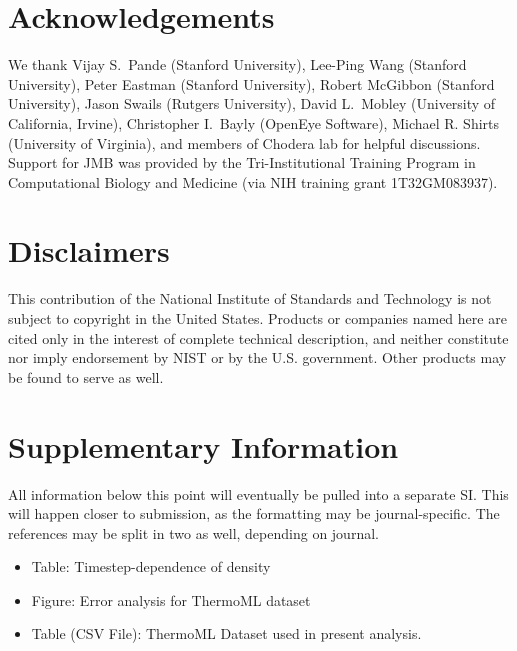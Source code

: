 \documentclass[aps,pre,twocolumn,nofootinbib,superscriptaddress,linenumbers]{revtex4-1}
\begin{document}
\section{Acknowledgements}

We thank Vijay S.~Pande (Stanford University), Lee-Ping Wang (Stanford University), Peter Eastman (Stanford University), Robert McGibbon (Stanford University), Jason Swails (Rutgers University), David L.~Mobley (University of California, Irvine), Christopher I.~Bayly (OpenEye Software), Michael R. Shirts (University of Virginia), and members of Chodera lab for helpful discussions.  
Support for JMB was provided by the Tri-Institutional Training Program in Computational Biology and Medicine (via NIH training grant 1T32GM083937).


\section{Disclaimers}

This contribution of the National Institute of Standards and Technology is not subject to copyright in the United States.  
Products or companies named here are cited only in the interest of complete technical description, and neither constitute nor imply endorsement by NIST or by the U.S. government.  Other products may be found to serve as well.

\clearpage

\appendix 

\section{Supplementary Information}

All information below this point will eventually be pulled into a separate SI.  
This will happen closer to submission, as the formatting may be journal-specific.  
The references may be split in two as well, depending on journal.

\begin{itemize}
 \item Table: Timestep-dependence of density
 \item Figure: Error analysis for ThermoML dataset
 \item Table (CSV File): ThermoML Dataset used in present analysis.
\end{itemize}
\end{document}
